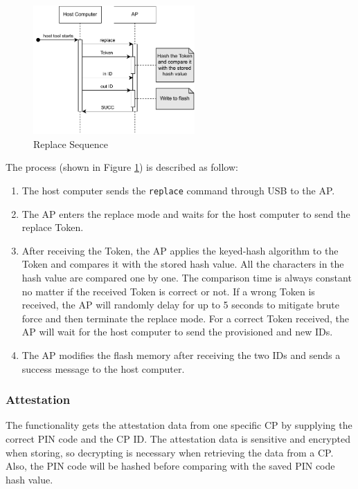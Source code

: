 \documentclass[11pt,oneside,onecolumn,letterpaper]{article}
\newcounter{alg}
\begin{document}
	\begin{figure}[h]
		\centering
		\includegraphics[width=0.55\textwidth]{pics/replace.pdf}
		\caption{Replace Sequence}
		\label{fig:functionality_replace}
	\end{figure}
	
	The process (shown in Figure \ref{fig:functionality_replace}) is described as follow:
	
	\begin{enumerate}
		\item The host computer sends the \texttt{replace} command through USB to the AP.
		\item The AP enters the replace mode and waits for the host computer to send the replace Token.
		\item After receiving the Token,
		the AP applies the keyed-hash algorithm to the Token and compares it with the stored hash value.
		All the characters in the hash value are compared one by one.
		The comparison time is always constant no matter if the received Token is correct or not.
		If a wrong Token is received,
		the AP will randomly delay for up to 5 seconds to mitigate brute force and then terminate the replace mode.
		For a correct Token received,
		the AP will wait for the host computer to send the provisioned and new IDs.
		\item The AP modifies the flash memory after receiving the two IDs and sends a success message to the host computer.
	\end{enumerate}
	
	\subsubsection{Attestation}
	The functionality gets the attestation data from one specific CP by supplying the correct PIN code and the CP ID.
	The attestation data is sensitive and encrypted when storing,
	so decrypting is necessary when retrieving the data from a CP.
	Also,
	the PIN code will be hashed before comparing with the saved PIN code hash value.
	
\end{document}
